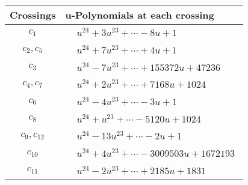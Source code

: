 \documentclass[1p]{elsarticle_modified}
\theoremstyle{definition}
\begin{document}
\begin{tabular}{m{50pt}|m{274pt}}
Crossings & \hspace{64pt}u-Polynomials at each crossing \\
\hline $$\begin{aligned}c_{1}\end{aligned}$$&$\begin{aligned}
&u^{24}+3 u^{23}+\cdots-8 u+1
\end{aligned}$\\
\hline $$\begin{aligned}c_{2},c_{5}\end{aligned}$$&$\begin{aligned}
&u^{24}+7 u^{23}+\cdots+4 u+1
\end{aligned}$\\
\hline $$\begin{aligned}c_{3}\end{aligned}$$&$\begin{aligned}
&u^{24}-7 u^{23}+\cdots+155372 u+47236
\end{aligned}$\\
\hline $$\begin{aligned}c_{4},c_{7}\end{aligned}$$&$\begin{aligned}
&u^{24}+2 u^{23}+\cdots+7168 u+1024
\end{aligned}$\\
\hline $$\begin{aligned}c_{6}\end{aligned}$$&$\begin{aligned}
&u^{24}-4 u^{23}+\cdots-3 u+1
\end{aligned}$\\
\hline $$\begin{aligned}c_{8}\end{aligned}$$&$\begin{aligned}
&u^{24}+u^{23}+\cdots-5120 u+1024
\end{aligned}$\\
\hline $$\begin{aligned}c_{9},c_{12}\end{aligned}$$&$\begin{aligned}
&u^{24}-13 u^{23}+\cdots-2 u+1
\end{aligned}$\\
\hline $$\begin{aligned}c_{10}\end{aligned}$$&$\begin{aligned}
&u^{24}+4 u^{23}+\cdots-3009503 u+1672193
\end{aligned}$\\
\hline $$\begin{aligned}c_{11}\end{aligned}$$&$\begin{aligned}
&u^{24}-2 u^{23}+\cdots+2185 u+1831
\end{aligned}$\\
\hline
\end{tabular}\\~\\
\end{document}
